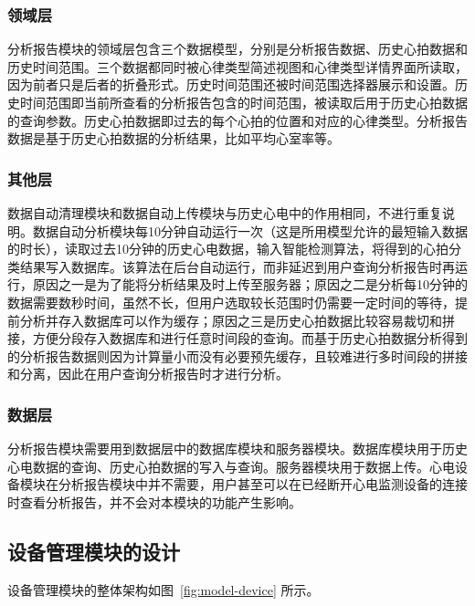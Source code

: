 \subsubsection{领域层}

分析报告模块的领域层包含三个数据模型，分别是分析报告数据、历史心拍数据和历史时间范围。三个数据都同时被心律类型简述视图和心律类型详情界面所读取，因为前者只是后者的折叠形式。历史时间范围还被时间范围选择器展示和设置。历史时间范围即当前所查看的分析报告包含的时间范围，被读取后用于历史心拍数据的查询参数。历史心拍数据即过去的每个心拍的位置和对应的心律类型。分析报告数据是基于历史心拍数据的分析结果，比如平均心室率等。

\subsubsection{其他层}

数据自动清理模块和数据自动上传模块与历史心电中的作用相同，不进行重复说明。数据自动分析模块每10分钟自动运行一次（这是所用模型允许的最短输入数据的时长），读取过去10分钟的历史心电数据，输入智能检测算法，将得到的心拍分类结果写入数据库。该算法在后台自动运行，而非延迟到用户查询分析报告时再运行，原因之一是为了能将分析结果及时上传至服务器；原因之二是分析每10分钟的数据需要数秒时间，虽然不长，但用户选取较长范围时仍需要一定时间的等待，提前分析并存入数据库可以作为缓存；原因之三是历史心拍数据比较容易裁切和拼接，方便分段存入数据库和进行任意时间段的查询。而基于历史心拍数据分析得到的分析报告数据则因为计算量小而没有必要预先缓存，且较难进行多时间段的拼接和分离，因此在用户查询分析报告时才进行分析。

\subsubsection{数据层}

分析报告模块需要用到数据层中的数据库模块和服务器模块。数据库模块用于历史心电数据的查询、历史心拍数据的写入与查询。服务器模块用于数据上传。心电设备模块在分析报告模块中并不需要，用户甚至可以在已经断开心电监测设备的连接时查看分析报告，并不会对本模块的功能产生影响。

\subsection{设备管理模块的设计}\label{subsec:device-design}

设备管理模块的整体架构如图~\ref{fig:model-device} 所示。

